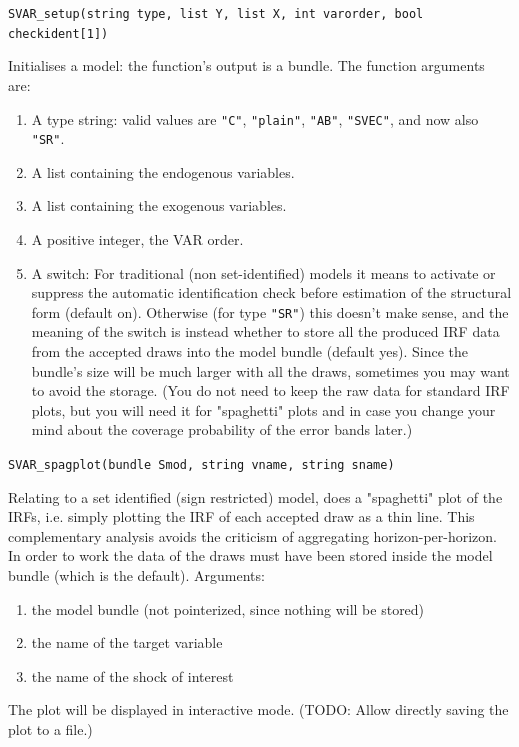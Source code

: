 \documentclass[a4paper,10pt]{article}
\newenvironment{funcdoc}[1]
{\noindent\hrulefill\newline\nopagebreak\texttt{#1}%
\nopagebreak\par\noindent\hrulefill%
\nopagebreak\par\nopagebreak\smallskip\nopagebreak\par}
{\bigskip}
\begin{document}
\begin{funcdoc}{SVAR\_setup(string type, list Y, list X, int varorder, 
  bool checkident[1])}
  Initialises a model: the function's output is a bundle. The function
  arguments are:
  \begin{enumerate}
  \item A type string: valid values are \texttt{"C"},
    \texttt{"plain"}, \texttt{"AB"}, \texttt{"SVEC"}, and now also \texttt{"SR"}.
  \item A list containing the endogenous variables.
  \item A list containing the exogenous variables.
  \item A positive integer, the VAR order.
  \item A switch: For traditional (non set-identified) models it means to activate or suppress 
   the automatic identification check before estimation of the structural form (default on). 
   Otherwise (for type \texttt{"SR"}) this doesn't make sense, and the meaning of the switch
   is instead whether to store all the produced IRF data from the accepted draws into the 
   model bundle (default yes). Since the bundle's size will be much larger with all the draws,
   sometimes you may want to avoid the storage. (You do not need to keep the raw data for 
   standard IRF plots, but you will need it for "spaghetti" plots and in case you change your 
   mind about the coverage probability of the error bands later.)
  \end{enumerate}
\end{funcdoc}

\begin{funcdoc}{SVAR\_spagplot(bundle Smod, string vname, string sname)}
 Relating to a set identified (sign restricted) model, does a "spaghetti" plot of the IRFs, 
 i.e. simply plotting the IRF of each accepted draw as a thin line. This complementary analysis
 avoids the criticism of aggregating horizon-per-horizon. 
 In order to work the data of the draws must have been stored inside the model bundle (which
 is the default).
 Arguments:
 \begin{enumerate}
  \item the model bundle (not pointerized, since nothing will be stored)
  \item the name of the target variable
  \item the name of the shock of interest
 \end{enumerate}
The plot will be displayed in interactive mode.
(TODO: Allow directly saving the plot to a file.)
\end{funcdoc}
\end{document}
